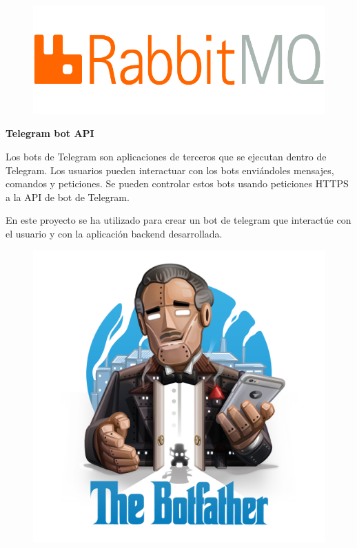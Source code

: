 \begin{figure}[h]
	\centering
	\includegraphics[scale=0.2]{images/21}
\end{figure}

\textbf{Telegram bot API} 

Los bots de Telegram \cite{ref24} son aplicaciones de terceros que se ejecutan dentro de Telegram. Los usuarios pueden interactuar con los bots enviándoles mensajes, comandos y peticiones. Se pueden controlar estos bots usando peticiones HTTPS a la API de bot de Telegram.

En este proyecto se ha utilizado para crear un bot de telegram que interactúe con el usuario y con la aplicación backend desarrollada.

\begin{figure}[h]
	\centering
	\includegraphics[scale=0.1]{images/22}
\end{figure}


